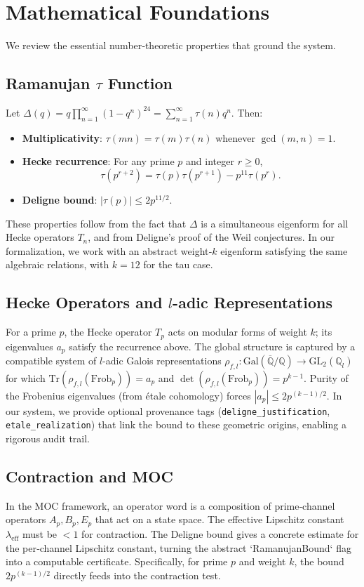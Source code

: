 \documentclass[11pt,a4paper]{article}
\begin{document}
\section{Mathematical Foundations}
We review the essential number‑theoretic properties that ground the system.

\subsection{Ramanujan $\tau$ Function}
Let $\Delta(q)=q\prod_{n=1}^\infty(1-q^n)^{24}=\sum_{n=1}^\infty\tau(n)q^n$. Then:
\begin{itemize}
    \item \textbf{Multiplicativity}: $\tau(mn)=\tau(m)\tau(n)$ whenever $\gcd(m,n)=1$.
    \item \textbf{Hecke recurrence}: For any prime $p$ and integer $r\ge0$, 
    \[
    \tau(p^{r+2})=\tau(p)\tau(p^{r+1})-p^{11}\tau(p^r).
    \]
    \item \textbf{Deligne bound}: $|\tau(p)|\le 2p^{11/2}$.
\end{itemize}
These properties follow from the fact that $\Delta$ is a simultaneous eigenform for all Hecke operators $T_n$, and from Deligne's proof of the Weil conjectures. In our formalization, we work with an abstract weight‑$k$ eigenform satisfying the same algebraic relations, with $k=12$ for the tau case.

\subsection{Hecke Operators and $l$-adic Representations}
For a prime $p$, the Hecke operator $T_p$ acts on modular forms of weight $k$; its eigenvalues $a_p$ satisfy the recurrence above. The global structure is captured by a compatible system of $l$-adic Galois representations $\rho_{f,l}: \mathrm{Gal}(\overline{\mathbb{Q}}/\mathbb{Q})\to\mathrm{GL}_2(\mathbb{Q}_l)$ for which $\mathrm{Tr}(\rho_{f,l}(\mathrm{Frob}_p))=a_p$ and $\det(\rho_{f,l}(\mathrm{Frob}_p))=p^{k-1}$. Purity of the Frobenius eigenvalues (from étale cohomology) forces $|a_p|\le 2p^{(k-1)/2}$. In our system, we provide optional provenance tags (\texttt{deligne\_justification}, \texttt{etale\_realization}) that link the bound to these geometric origins, enabling a rigorous audit trail.

\subsection{Contraction and MOC}
In the MOC framework, an operator word is a composition of prime‑channel operators $A_p,B_p,E_p$ that act on a state space. The effective Lipschitz constant $\lambda_{\text{eff}}$ must be $<1$ for contraction. The Deligne bound gives a concrete estimate for the per‑channel Lipschitz constant, turning the abstract `RamanujanBound` flag into a computable certificate. Specifically, for prime $p$ and weight $k$, the bound $2p^{(k-1)/2}$ directly feeds into the contraction test.
\end{document}
